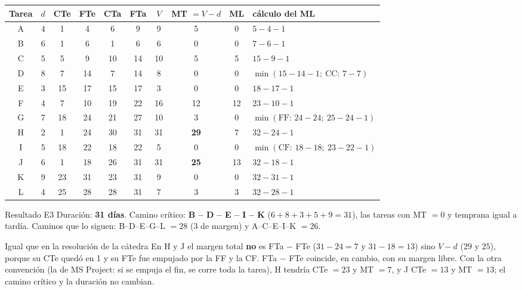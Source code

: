 \documentclass[11pt,a4paper]{article}
\begin{document}
\begin{center}\small
\begin{tabular}{cccccccccl}
\toprule
Tarea & $d$ & CTe & FTe & CTa & FTa & $V$ & MT $= V - d$ & ML & cálculo del ML\\
\midrule
A & 4 & 1 & 4 & 6 & 9 & 9 & 5 & 0 & $5 - 4 - 1$\\
B & 6 & 1 & 6 & 1 & 6 & 6 & 0 & 0 & $7 - 6 - 1$\\
C & 5 & 5 & 9 & 10 & 14 & 10 & 5 & 5 & $15 - 9 - 1$\\
D & 8 & 7 & 14 & 7 & 14 & 8 & 0 & 0 & $\min(15 - 14 - 1;\ \text{CC: } 7 - 7)$\\
E & 3 & 15 & 17 & 15 & 17 & 3 & 0 & 0 & $18 - 17 - 1$\\
F & 4 & 7 & 10 & 19 & 22 & 16 & 12 & 12 & $23 - 10 - 1$\\
G & 7 & 18 & 24 & 21 & 27 & 10 & 3 & 0 & $\min(\text{FF: } 24 - 24;\ 25 - 24 - 1)$\\
H & 2 & 1 & 24 & 30 & 31 & 31 & \textbf{29} & 7 & $32 - 24 - 1$\\
I & 5 & 18 & 22 & 18 & 22 & 5 & 0 & 0 & $\min(\text{CF: } 18 - 18;\ 23 - 22 - 1)$\\
J & 6 & 1 & 18 & 26 & 31 & 31 & \textbf{25} & 13 & $32 - 18 - 1$\\
K & 9 & 23 & 31 & 23 & 31 & 9 & 0 & 0 & $32 - 31 - 1$\\
L & 4 & 25 & 28 & 28 & 31 & 7 & 3 & 3 & $32 - 28 - 1$\\
\bottomrule
\end{tabular}
\end{center}
\begin{resultado}{Resultado E3}
Duración: \textbf{31 días}. Camino crítico: \textbf{B -- D -- E -- I -- K} ($6 + 8 + 3 + 5 + 9 = 31$), las tareas con
MT $= 0$ y temprana igual a tardía. Caminos que lo siguen: B--D--E--G--L $= 28$ (3 de margen) y A--C--E--I--K $=
26$.
\end{resultado}
\begin{aviso}{Igual que en la resolución de la cátedra}
En H y J el margen total \textbf{no} es FTa $-$ FTe ($31 - 24 = 7$ y $31 - 18 = 13$) sino $V - d$ ($29$ y $25$),
porque su CTe quedó en 1 y su FTe fue empujado por la FF y la CF. FTa $-$ FTe coincide, en cambio, con su margen
libre. Con la otra convención (la de MS Project: si se empuja el fin, se corre toda la tarea), H tendría CTe $=
23$ y MT $= 7$, y J CTe $= 13$ y MT $= 13$; el camino crítico y la duración no cambian.
\end{aviso}
\end{document}
